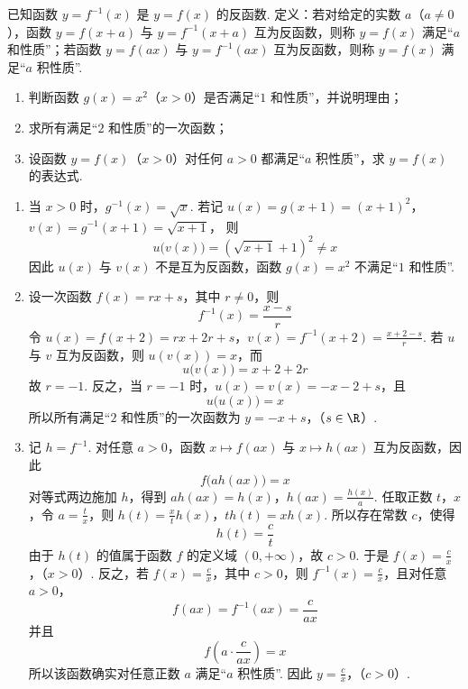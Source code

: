 \begin{problem}
已知函数 \(y = f^{-1}(x)\) 是 \(y = f(x)\) 的反函数. 定义：若对给定的实数 \(a\)（\(a \neq 0\)），函数 \(y = f(x + a)\) 与 \(y = f^{-1}(x + a)\) 互为反函数，则称 \(y = f(x)\) 满足“\(a\) 和性质”；若函数 \(y = f(ax)\) 与 \(y = f^{-1}(ax)\) 互为反函数，则称 \(y = f(x)\) 满足“\(a\) 积性质”.

\begin{enumerate}
\item 判断函数 \(g(x) = x^2\)（\(x > 0\)）是否满足“\(1\) 和性质”，并说明理由；

\item 求所有满足“\(2\) 和性质”的一次函数；

\item 设函数 \(y = f(x)\)（\(x > 0\)）对任何 \(a > 0\) 都满足“\(a\) 积性质”，求 \(y = f(x)\) 的表达式.
\end{enumerate}
\end{problem}

\begin{solution}
\begin{enumerate}
\item 当 \(x>0\) 时，\(g^{-1}(x)=\sqrt{x}\). 若记
\(u(x)=g(x+1)=(x+1)^2\)，\(v(x)=g^{-1}(x+1)=\sqrt{x+1}\)，
则
\[
u\bigl(v(x)\bigr)=\left(\sqrt{x+1}+1\right)^2\neq x
\]
因此 \(u(x)\) 与 \(v(x)\) 不是互为反函数，函数 \(g(x)=x^2\) 不满足“\(1\) 和性质”.

\item 设一次函数 \(f(x)=rx+s\)，其中 \(r\neq0\)，则
\[
f^{-1}(x)=\frac{x-s}{r}
\]
令
\(u(x)=f(x+2)=rx+2r+s\)，\(v(x)=f^{-1}(x+2)=\frac{x+2-s}{r}\).
若 \(u\) 与 \(v\) 互为反函数，则 \(u(v(x))=x\)，而
\[
u\bigl(v(x)\bigr)=x+2+2r
\]
故 \(r=-1\). 反之，当 \(r=-1\) 时，\(u(x)=v(x)=-x-2+s\)，且
\[
u\bigl(u(x)\bigr)=x
\]
所以所有满足“\(2\) 和性质”的一次函数为
\(y=-x+s\)，（\(s\in\R\)）.

\item 记 \(h=f^{-1}\). 对任意 \(a>0\)，函数 \(x\mapsto f(ax)\) 与 \(x\mapsto h(ax)\) 互为反函数，因此
\[
f\bigl(a h(ax)\bigr)=x
\]
对等式两边施加 \(h\)，得到
\(a h(ax)=h(x)\)，\(h(ax)=\frac{h(x)}{a}\).
任取正数 \(t\)，\(x\)，令 \(a=\frac{t}{x}\)，则
\(h(t)=\frac{x}{t}h(x)\)，\(th(t)=xh(x)\).
所以存在常数 \(c\)，使得
\[
h(t)=\frac{c}{t}
\]
由于 \(h(t)\) 的值属于函数 \(f\) 的定义域 \((0,+\infty)\)，故 \(c>0\). 于是
\(f(x)=\frac{c}{x}\)，（\(x>0\)）.
反之，若 \(f(x)=\frac{c}{x}\)，其中 \(c>0\)，则 \(f^{-1}(x)=\frac{c}{x}\)，且对任意 \(a>0\)，
\[
f(ax)=f^{-1}(ax)=\frac{c}{ax}
\]
并且
\[
f\left(a\cdot\frac{c}{ax}\right)=x
\]
所以该函数确实对任意正数 \(a\) 满足“\(a\) 积性质”. 因此
\(y=\frac{c}{x}\)，（\(c>0\)）.
\end{enumerate}
\end{solution}

